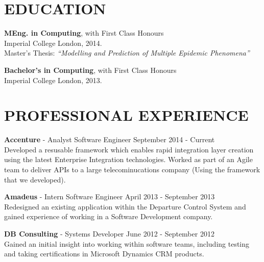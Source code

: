 \documentclass[margin, 10pt]{res} %
\begin{document}
\begin{resume}

\section{EDUCATION}

\textbf{MEng. in Computing}, with First Class Honours \\
Imperial College London, 2014. \\
Master’s Thesis: \textit{``Modelling and Prediction of Multiple Epidemic Phenomena''}

\textbf{Bachelor's in Computing}, with First Class Honours \\
Imperial College London, 2013. \\                                  

 
\section{PROFESSIONAL EXPERIENCE}

\textbf{Accenture} - Analyst Software Engineer \hfill September 2014 - Current \\
Developed a resusable framework which enables rapid integration layer creation using the latest Enterprise Integration technologies.
Worked as part of an Agile team to deliver APIs to a large telecominucations company (Using the framework that we developed).
 
\textbf{Amadeus} - Intern Software Engineer \hfill April 2013 - September 2013 \\
Redesigned an existing application within the Departure Control System and gained experience of working in a Software Development company.

\textbf{DB Consulting} - Systems Developer \hfill June 2012 - September 2012 \\
Gained an initial insight into working within software teams, including testing and taking certifications in Microsoft Dynamics CRM products. \\




\end{resume}
\end{document}
